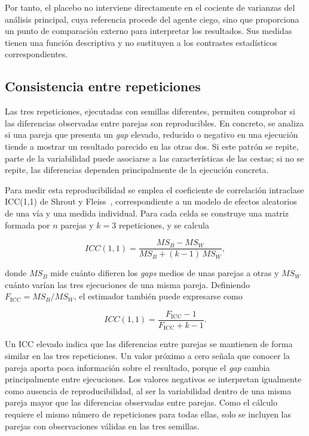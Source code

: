 Por tanto, el placebo no interviene directamente en el cociente de varianzas del análisis principal, cuya referencia procede del agente ciego, sino que proporciona un punto de comparación externo para interpretar los resultados. Sus medidas tienen una función descriptiva y no sustituyen a los contrastes estadísticos correspondientes.



\subsection{Consistencia entre repeticiones}
\label{subsec:icc}

Las tres repeticiones, ejecutadas con semillas diferentes, permiten comprobar si las diferencias observadas entre parejas son reproducibles. En concreto, se analiza si una pareja que presenta un \textit{gap} elevado, reducido o negativo en una ejecución tiende a mostrar un resultado parecido en las otras dos. Si este patrón se repite, parte de la variabilidad puede asociarse a las características de las cestas; si no se repite, las diferencias dependen principalmente de la ejecución concreta.

Para medir esta reproducibilidad se emplea el coeficiente de correlación intraclase ICC(1,1) de Shrout y Fleiss~\cite{shrout1979intraclass}, correspondiente a un modelo de efectos aleatorios de una vía y una medida individual. Para cada celda se construye una matriz formada por $n$ parejas y $k=3$ repeticiones, y se calcula

\begin{equation}
	ICC(1,1) =
	\frac{MS_B-MS_W}
	{MS_B+(k-1)\,MS_W},
	\label{eq:icc}
\end{equation}

donde $MS_B$ mide cuánto difieren los \textit{gaps} medios de unas parejas a otras y $MS_W$ cuánto varían las tres ejecuciones de una misma pareja. Definiendo $F_{\mathrm{ICC}}=MS_B/MS_W$, el estimador también puede expresarse como

\begin{equation}
	ICC(1,1) =
	\frac{F_{\mathrm{ICC}}-1}
	{F_{\mathrm{ICC}}+k-1}.
	\label{eq:icc_alt}
\end{equation}

Un ICC elevado indica que las diferencias entre parejas se mantienen de forma similar en las tres repeticiones. Un valor próximo a cero señala que conocer la pareja aporta poca información sobre el resultado, porque el \textit{gap} cambia principalmente entre ejecuciones. Los valores negativos se interpretan igualmente como ausencia de reproducibilidad, al ser la variabilidad dentro de una misma pareja mayor que las diferencias observadas entre parejas. Como el cálculo requiere el mismo número de repeticiones para todas ellas, solo se incluyen las parejas con observaciones válidas en las tres semillas.

